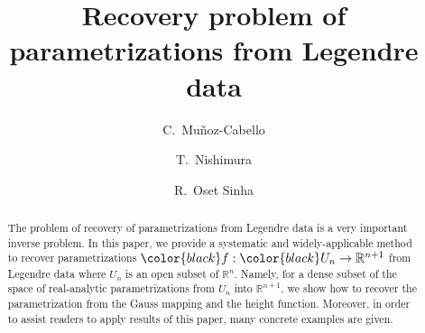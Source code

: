 \documentclass{amsart}
\theoremstyle{definition}
\theoremstyle{definition}
\theoremstyle{definition}
\newcommand{\ch}[1]{{\color{black} #1}}
\begin{document}
\title[
Recovery problem of parametrizations from Legendre data 
]
{Recovery problem of parametrizations from Legendre data  
}
\author[C.~Mu\~{n}oz-Cabello]{C.~Mu\~{n}oz-Cabello}
\address{C.~Mu\~{n}oz-Cabello \\ 
Departament de Matem\`{a}tiques, Universitat de Val\`{e}ncia, Campus de
Burjassot, 46100 Burjassot, Spain}
\author[T.~Nishimura]{T.~Nishimura%
}
\address{T.~Nishimura \\
Research Institute of Environment and Information Sciences,
Yokohama National University,
Yokohama 240-8501, Japan}
\author[R.~Oset Sinha]{R.~Oset Sinha}
\address{R.~Oset Sinha \\
Departament de Matem\`{a}tiques, Universitat de Val\`{e}ncia, Campus de
Burjassot, 46100 Burjassot, Spain}
\begin{abstract}
The problem of recovery 
of parametrizations from Legendre data is a very important inverse problem.    
In this paper,  %
we provide a systematic and widely-applicable method to %
recover parametrizations 
$\ch{f}: {\color{black}U_n}\to \mathbb{R}^{n+1}$ from Legendre data 
where $U_n$ is an open subset of $\mathbb R^n$.  
Namely, for a dense subset of {\color{black}the space of real-analytic
parametrizations %
from $U_n$ into $\mathbb{R}^{n+1}$}, 
 we show how to recover 
the parametrization from the Gauss mapping and the height function.     
{\color{black} 
Moreover, in order to assist readers to apply results of this paper, 
many concrete examples are given.  
} 
\end{abstract}


\date{}

\maketitle
\end{document}
